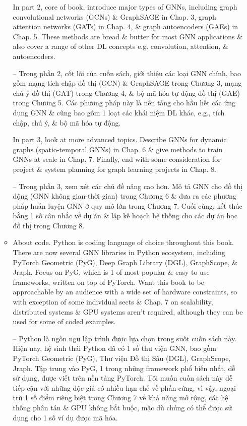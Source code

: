 \documentclass{article}
\begin{document}
\begin{itemize}
\begin{itemize}
        In part 2, core of book, introduce major types of GNNs, including graph convolutional networks (GCNs) \& GraphSAGE in Chap. 3, graph attention networks (GATs) in Chap. 4, \& graph autoencoders (GAEs) in Chap. 5. These methods are bread \& butter for most GNN applications \& also cover a range of other DL concepts e.g. convolution, attention, \& autoencoders.

        -- Trong phần 2, cốt lõi của cuốn sách, giới thiệu các loại GNN chính, bao gồm mạng tích chập đồ thị (GCN) \& GraphSAGE trong Chương 3, mạng chú ý đồ thị (GAT) trong Chương 4, \& bộ mã hóa tự động đồ thị (GAE) trong Chương 5. Các phương pháp này là nền tảng cho hầu hết các ứng dụng GNN \& cũng bao gồm 1 loạt các khái niệm DL khác, e.g., tích chập, chú ý, \& bộ mã hóa tự động.

        In part 3, look at more advanced topics. Describe GNNs for dynamic graphs (spatio-temporal GNNs) in Chap. 6 \& give methods to train GNNs at scale in Chap. 7. Finally, end with some consideration for project \& system planning for graph learning projects in Chap. 8.

        -- Trong phần 3, xem xét các chủ đề nâng cao hơn. Mô tả GNN cho đồ thị động (GNN không gian-thời gian) trong Chương 6 \& đưa ra các phương pháp huấn luyện GNN ở quy mô lớn trong Chương 7. Cuối cùng, kết thúc bằng 1 số cân nhắc về dự án \& lập kế hoạch hệ thống cho các dự án học đồ thị trong Chương 8.
        \item {\sf About code.} Python is coding language of choice throughout this book. There are now several GNN libraries in Python ecosystem, including PyTorch Geometric (PyG), Deep Graph Library (DGL), GraphScope, \& Jraph. Focus on PyG, which is 1 of most popular \& easy-to-use frameworks, written on top of PyTorch. Want this book to be approachable by an audience with a wide set of hardware constraints, so with exception of some individual sects \& Chap. 7 on scalability, distributed systems \& GPU systems aren't required, although they can be used for some of coded examples.

        -- Python là ngôn ngữ lập trình được lựa chọn trong suốt cuốn sách này. Hiện nay, hệ sinh thái Python đã có 1 số thư viện GNN, bao gồm PyTorch Geometric (PyG), Thư viện Đồ thị Sâu (DGL), GraphScope, Jraph. Tập trung vào PyG, 1 trong những framework phổ biến nhất, dễ sử dụng, được viết trên nền tảng PyTorch. Tôi muốn cuốn sách này dễ tiếp cận với những độc giả có nhiều hạn chế về phần cứng, vì vậy, ngoại trừ 1 số điểm riêng biệt trong Chương 7 về khả năng mở rộng, các hệ thống phân tán \& GPU không bắt buộc, mặc dù chúng có thể được sử dụng cho 1 số ví dụ được mã hóa.


\end{itemize}
\end{itemize}
\end{document}
